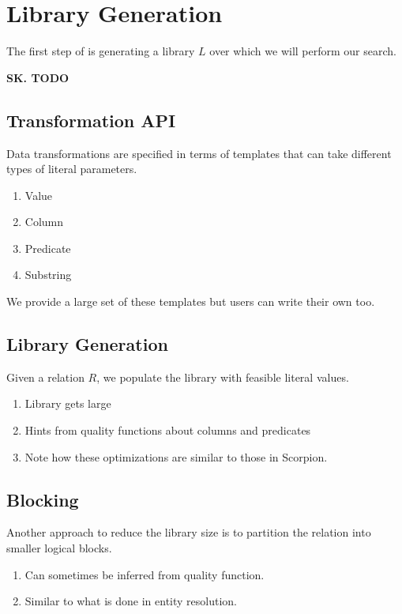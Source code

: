 \section{Library Generation}
The first step of \sys is generating a library $L$ over which we will perform our search.

\textbf{SK. TODO}

\subsection{Transformation API}
Data transformations are specified in terms of templates that can take different types of literal parameters.

\begin{enumerate}
    \item Value
    \item Column
    \item Predicate
    \item Substring
\end{enumerate}

We provide a large set of these templates but users can write their own too.


\subsection{Library Generation}
Given a relation $R$, we populate the library with feasible literal values.

\begin{enumerate}
    \item Library gets large
    \item Hints from quality functions about columns and predicates
    \item Note how these optimizations are similar to those in Scorpion.
\end{enumerate}

\subsection{Blocking}
Another approach to reduce the library size is to partition the relation into smaller logical blocks.

\begin{enumerate}
    \item Can sometimes be inferred from quality function.
    \item Similar to what is done in entity resolution.
\end{enumerate}

